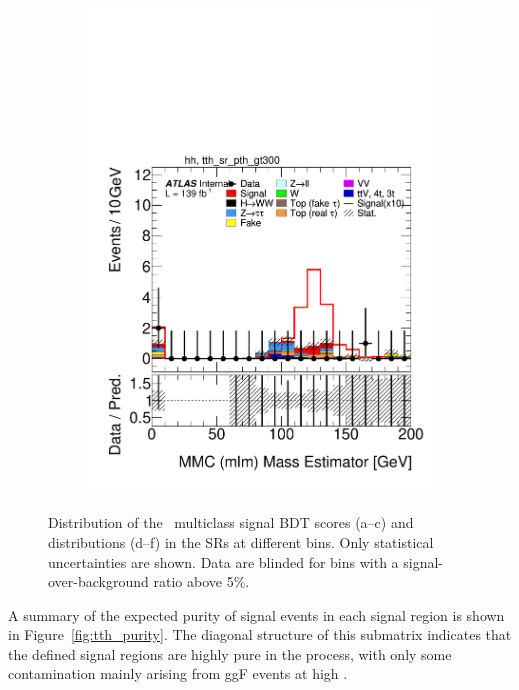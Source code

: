 \begin{figure}[h]
\begin{subfigure}[b]{0.32\textwidth}
    \includegraphics[width=\textwidth]{images/sr_cr_plots/plot_ditau_mmc_mlm_m_hh_tth_sr_pth_gt300.pdf}
    \caption{}
  \end{subfigure}

  \caption{Distribution of the \ttH\ multiclass signal BDT scores (a–c) and \mtt distributions 
  (d–f) in the SRs at different \pth bins. Only statistical uncertainties are shown. Data are blinded for 
  bins with a signal-over-background ratio above 5\%.
  }
  \label{fig:bdt_signal}
\end{figure}


A summary of the expected purity of \ttHtt signal events in each signal region is shown in Figure~\ref{fig:tth_purity}. The diagonal structure of this submatrix indicates that the defined signal regions are highly pure in the \ttH process, with only some contamination mainly arising from ggF events at high \pth.

